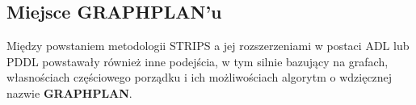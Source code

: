     \subsection{Miejsce GRAPHPLAN'u}
    Między powstaniem metodologii STRIPS a jej rozszerzeniami w postaci ADL lub PDDL powstawały również inne podejścia, w tym silnie 
    bazujący na grafach, własnościach częściowego porządku i ich możliwościach algorytm o wdzięcznej nazwie \textbf{GRAPHPLAN}.






